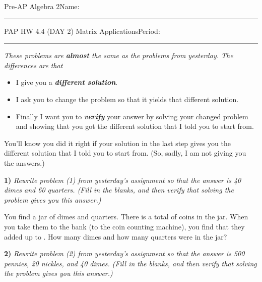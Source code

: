 \documentclass[10pt,letterpaper]{memoir}
\begin{document}
\pagestyle{plain}
\checkandfixthelayout
{}



{\small Pre-AP Algebra 2}\hfill Name: \rule{2in}{0.15mm}

{\Large PAP HW 4.4 (DAY 2) Matrix Applications}\hfill Period: \rule{0.5in}{0.15mm}

\begin{tcolorbox}
    \itshape\small
    These problems are {\bfseries\itshape almost} the same
    as the problems from yesterday. 
    The differences are that 
    \begin{itemize}[topsep=0in,itemsep=0em]
        \item I give you a {\bfseries\itshape different solution}.
        \item I ask you to change the problem so that it yields that different solution.
        \item Finally I want you to {\bfseries\itshape verify} 
        your answer by solving your changed problem and showing 
        that you got the different solution that I told you to start from.
    \end{itemize}
    \vspace{1em}
    You'll know you did it right if your solution in the last step
    gives you the different solution that I told you to start from.
    (So, sadly, I am not giving you the answers.)
\end{tcolorbox}




{\bfseries\large 1)} 
{\itshape
Rewrite problem (1) from yesterday's assignment so that 
the answer is 40 dimes and 60 quarters. (Fill in the blanks, and then verify 
that solving the problem gives you this answer.)
}

You find a jar of dimes and quarters.
There is a total of  coins in the jar.
When you take them to the bank (to the coin counting machine),
you find that they added up to .
How many dimes and how many quarters were in the jar?

\myWideMatrixTable[-0.1in]

\vspace{0.5in}




{\bfseries\large 2)} 
{\itshape
Rewrite problem (2) from yesterday's assignment so that 
the answer is 500 pennies, 20 nickles, and 40 dimes. (Fill in the blanks, and then verify 
that solving the problem gives you this answer.)
}
\end{document}
